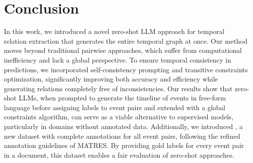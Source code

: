 \section{Conclusion}

In this work, we introduced a novel zero-shot LLM approach for temporal relation extraction that generates the entire temporal graph at once. 
Our method moves beyond traditional pairwise approaches, which suffer from computational inefficiency and lack a global perspective. To ensure temporal consistency in predictions, we incorporated self-consistency prompting and transitive constraints optimization, significantly improving both accuracy and efficiency while generating relations completely free of inconsistencies. Our results show that zero-shot LLMs, when prompted to generate the timeline of events in free-form language before assigning labels to event pairs and extended with a global constraints algorithm, can serve as a viable alternative to supervised models, particularly in domains without annotated data. Additionally, we introduced \textit{\App{}}, a new dataset with complete annotations for all event pairs, following the refined annotation guidelines of MATRES. By providing gold labels for every event pair in a document, this dataset enables a fair evaluation of zero-shot approaches.


